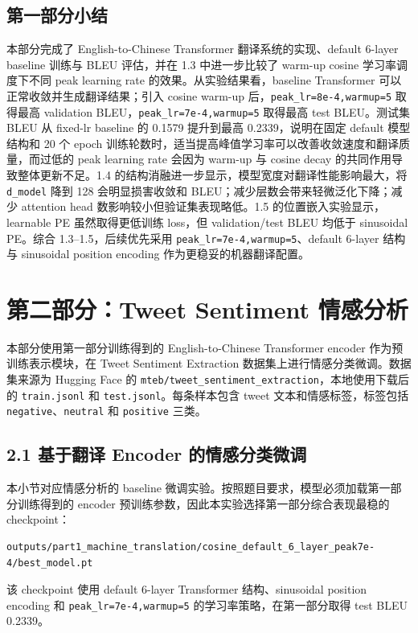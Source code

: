 ﻿\documentclass[UTF8,a4paper,12pt]{ctexart}
\begin{document}
\subsection{第一部分小结}

本部分完成了 English-to-Chinese Transformer 翻译系统的实现、default 6-layer baseline 训练与 BLEU 评估，并在 1.3 中进一步比较了 warm-up cosine 学习率调度下不同 peak learning rate 的效果。从实验结果看，baseline Transformer 可以正常收敛并生成翻译结果；引入 cosine warm-up 后，\texttt{peak\_lr=8e-4,warmup=5} 取得最高 validation BLEU，\texttt{peak\_lr=7e-4,warmup=5} 取得最高 test BLEU。测试集 BLEU 从 fixed-lr baseline 的 0.1579 提升到最高 0.2339，说明在固定 default 模型结构和 20 个 epoch 训练轮数时，适当提高峰值学习率可以改善收敛速度和翻译质量，而过低的 peak learning rate 会因为 warm-up 与 cosine decay 的共同作用导致整体更新不足。1.4 的结构消融进一步显示，模型宽度对翻译性能影响最大，将 \texttt{d\_model} 降到 128 会明显损害收敛和 BLEU；减少层数会带来轻微泛化下降；减少 attention head 数影响较小但验证集表现略低。1.5 的位置嵌入实验显示，learnable PE 虽然取得更低训练 loss，但 validation/test BLEU 均低于 sinusoidal PE。综合 1.3--1.5，后续优先采用 \texttt{peak\_lr=7e-4,warmup=5}、default 6-layer 结构与 sinusoidal position encoding 作为更稳妥的机器翻译配置。
\section{第二部分：Tweet Sentiment 情感分析}

本部分使用第一部分训练得到的 English-to-Chinese Transformer encoder 作为预训练表示模块，在 Tweet Sentiment Extraction 数据集上进行情感分类微调。数据集来源为 Hugging Face 的 \texttt{mteb/tweet\_sentiment\_extraction}，本地使用下载后的 \texttt{train.jsonl} 和 \texttt{test.jsonl}。每条样本包含 tweet 文本和情感标签，标签包括 \texttt{negative}、\texttt{neutral} 和 \texttt{positive} 三类。

\subsection{2.1 基于翻译 Encoder 的情感分类微调}

本小节对应情感分析的 baseline 微调实验。按照题目要求，模型必须加载第一部分训练得到的 encoder 预训练参数，因此本实验选择第一部分综合表现最稳的 checkpoint：
\begin{lstlisting}
outputs/part1_machine_translation/cosine_default_6_layer_peak7e-4/best_model.pt
\end{lstlisting}
该 checkpoint 使用 default 6-layer Transformer 结构、sinusoidal position encoding 和 \texttt{peak\_lr=7e-4,warmup=5} 的学习率策略，在第一部分取得 test BLEU 0.2339。
\end{document}
